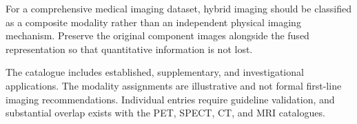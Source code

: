 For a comprehensive medical imaging dataset, hybrid imaging should be classified as a composite modality rather than an independent physical imaging mechanism. Preserve the original component images alongside the fused representation so that quantitative information is not lost.

The catalogue includes established, supplementary, and investigational applications. The modality assignments are illustrative and not formal first-line imaging recommendations. Individual entries require guideline validation, and substantial overlap exists with the PET, SPECT, CT, and MRI catalogues.
